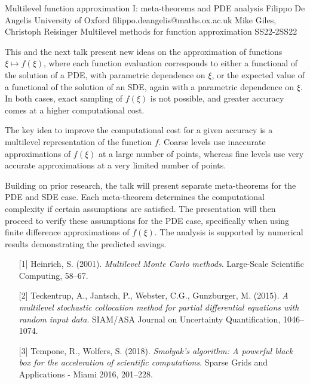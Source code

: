 \begin{talk}
  {Multilevel function approximation I: meta-theorems and PDE analysis}%
  {Filippo De Angelis}%
  {University of Oxford}%
  {filippo.deangelis@maths.ox.ac.uk}%
  {Mike Giles, Christoph Reisinger}%
{Multilevel methods for function approximation}
{}{SS22-2}{SS22}


This and the next talk present new ideas on the approximation of functions $\xi \mapsto f(\xi)$, where each function evaluation corresponds to either a functional of the solution of a PDE, with parametric dependence on $\xi$, or the expected value of a functional of the solution of an SDE, again with a parametric dependence on $\xi$. In both cases, exact sampling of $f(\xi)$ is not possible, and greater accuracy comes at a higher computational cost.

The key idea to improve the computational cost for a given accuracy is a multilevel representation of the function $f$. Coarse levels use inaccurate approximations of $f(\xi)$ at a large number of points, whereas fine levels use very accurate approximations at a very limited number of points.

Building on prior research, the talk will present separate meta-theorems for the PDE and SDE case. Each meta-theorem determines the computational complexity if certain assumptions are satisfied. The presentation will then proceed to verify these assumptions for the PDE case, specifically when using finite difference approximations of $f(\xi)$. The analysis is supported by numerical results demonstrating the predicted savings.

\medskip

\begin{enumerate}
	\item[{[1]}] Heinrich, S. (2001). {\it Multilevel Monte Carlo methods}. Large-Scale Scientific Computing, 58–67.
    \item[{[2]}] Teckentrup, A., Jantsch, P., Webster, C.G., Gunzburger, M. (2015). {\it A multilevel stochastic collocation method for partial differential equations with random input data}. SIAM/ASA Journal on Uncertainty Quantification, 1046–1074.
    \item[{[3]}] Tempone, R., Wolfers, S. (2018). {\it Smolyak’s algorithm: A powerful black box for the acceleration of scientific computations}. Sparse Grids and Applications - Miami 2016, 201–228.
\end{enumerate}

\end{talk}

